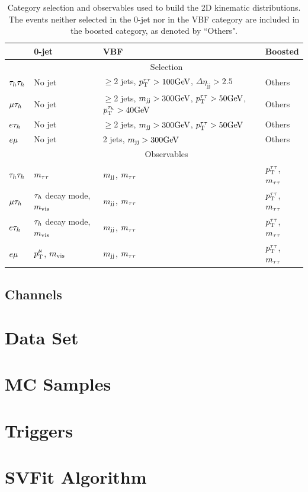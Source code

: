 \begin{table}
\centering
\begin{tabular}{llll}
 & 0-jet & VBF & Boosted \\
\hline
 & \multicolumn{3}{c}{Selection} \\ \cline{2-4}
$\tau_{h}\tau_{h}$ & No jet &  $\geq$2 jets, $p_\mathrm{T}^{\tau\tau}>100\mathrm{GeV}$, $\Delta\eta_{\mathrm{jj}}>2.5$ & Others\\
$\mu\tau_{h}$ & No jet &  $\geq$2 jets, $m_\mathrm{jj}>300\mathrm{GeV}$, $p_\mathrm{T}^{\tau\tau}>50\mathrm{GeV}$, $p_\mathrm{T}^{\tau_{h}}>40\mathrm{GeV}$ & Others\\
$e\tau_{h}$ & No jet &  $\geq$2 jets, $m_\mathrm{jj}>300\mathrm{GeV}$, $p_\mathrm{T}^{\tau\tau}>50\mathrm{GeV}$ & Others\\
$e\mu$ & No jet & 2 jets, $m_\mathrm{jj}>300\mathrm{GeV}$ & Others \\
\hline
 & \multicolumn{3}{c}{Observables}\\ \cline{2-4}
$\tau_{h}\tau_{h}$ & $m_{\tau\tau}$                 &    $m_\mathrm{jj}$, $m_{\tau\tau}$  &   $p_\mathrm{T}^{\tau\tau}$, $m_{\tau\tau}$  \\
$\mu\tau_{h}$ & $\tau_{h}$ decay mode, $m_\text{vis}$   &    $m_\mathrm{jj}$, $m_{\tau\tau}$  &  $p_\mathrm{T}^{\tau\tau}$, $m_{\tau\tau}$  \\
$e\tau_{h}$ & $\tau_{h}$ decay mode, $m_\text{vis}$   &    $m_\mathrm{jj}$, $m_{\tau\tau}$  &  $p_\mathrm{T}^{\tau\tau}$, $m_{\tau\tau}$ \\
$e\mu$ & $p_\mathrm{T}^{\mu}$, $m_\text{vis}$   &     $m_\mathrm{jj}$, $m_{\tau\tau}$  &   $p_\mathrm{T}^{\tau\tau}$, $m_{\tau\tau}$  \\
\hline
\end{tabular}
\caption{ Category selection and observables used to build the 2D kinematic distributions. The events neither selected in the 0-jet nor in the VBF category are included in the boosted category, as denoted by ``Others".
\label{tab:categories}
}
\end{table}

\subsection{Channels}
\section{Data Set}
\section{MC Samples}
\section{Triggers}
\section{SVFit Algorithm}
